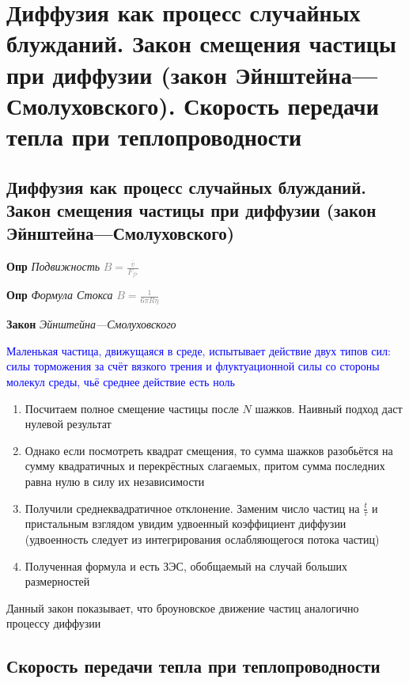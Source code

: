 \documentclass[a4paper, 14pt]{article}
\begin{document}
    \section{Диффузия как процесс случайных блужданий. Закон смещения частицы при диффузии (закон
    Эйнштейна—Смолуховского).
    Скорость передачи тепла при теплопроводности}
    
    \subsection{Диффузия как процесс случайных блужданий. Закон смещения частицы при диффузии (закон
    Эйнштейна—Смолуховского)}
    
    \textbf{Опр} \textit{Подвижность} \textcolor{gray}{$B = \frac{\overline{v}}{F_{fr}}$}
    
    \textbf{Опр} \textit{Формула Стокса} \textcolor{gray}{$B = \frac{1}{6 \pi R \eta}$}
    
    \textbf{Закон} \textit{Эйнштейна—Смолуховского}
    
    \textcolor{blue}{Маленькая частица, движущаяся в среде, испытывает действие двух типов сил: силы торможения за
    счёт вязкого трения и флуктуационной силы со стороны молекул среды, чьё среднее действие есть ноль}
    
    \begin{enumerate}
        \item Посчитаем полное смещение частицы после $N$ шажков.
        Наивный подход даст нулевой результат
        \item Однако если посмотреть квадрат смещения, то сумма шажков разобьётся на сумму квадратичных и
        перекрёстных слагаемых, притом сумма последних равна нулю в силу их независимости
        \item Получили среднеквадратичное отклонение.
        Заменим число частиц на $\frac{t}{\tau}$ и пристальным взглядом увидим удвоенный коэффициент диффузии
        (удвоенность следует из интегрирования ослабляющегося потока частиц)
        \item Полученная формула и есть ЗЭС, обобщаемый на случай больших размерностей
    \end{enumerate}
    
    Данный закон показывает, что броуновское движение частиц аналогично процессу диффузии
    
    \subsection{Скорость передачи тепла при теплопроводности}
    
\end{document}

